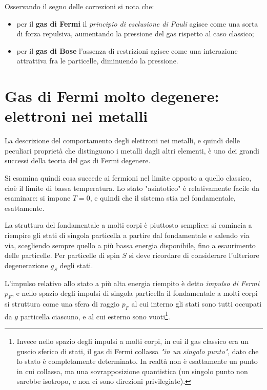 Osservando il segno delle correzioni si nota che:
\begin{itemize}
	\item per il \textbf{gas di Fermi} il \textit{principio di esclusione di Pauli} agisce come una sorta di forza repulsiva, aumentando la pressione del gas rispetto al caso classico;
	\item per il \textbf{gas di Bose} l'assenza di restrizioni agisce come una interazione attrattiva fra le particelle, diminuendo la pressione.
\end{itemize}

\section{Gas di Fermi molto degenere: elettroni nei metalli}
\label{sec:fermigas}
La descrizione del comportamento degli elettroni nei metalli, e quindi delle peculiari proprietà che distinguono i metalli dagli altri elementi, è uno dei grandi successi della teoria del gas di Fermi degenere.
\newline

Si esamina quindi cosa succede ai fermioni nel limite opposto a quello classico, cioè il limite di bassa temperatura.
Lo stato "asintotico" è relativamente facile da esaminare: si impone $T=0$, e quindi che il sistema stia nel fondamentale, esattamente.

La struttura del fondamentale a molti corpi è piuttosto semplice: si comincia a riempire gli stati di singola particella a partire dal fondamentale e salendo via via, scegliendo sempre quello a più bassa energia disponibile, fino a esaurimento delle particelle. Per particelle di spin $S$ si deve ricordare di considerare l'ulteriore degenerazione $g_S$ degli stati.

L'impulso relativo allo stato a più alta energia riempito è detto \textit{impulso di Fermi} $p_F$, e nello spazio degli impulsi di singola particella il fondamentale a molti corpi si struttura come una sfera di raggio $p_F$ al cui interno gli stati sono tutti occupati da $g$ particella ciascuno, e al cui esterno sono vuoti\footnote{Invece nello spazio degli impulsi a molti corpi, in cui il gas classico era un guscio sferico di stati, il gas di Fermi collassa \textit{"in un singolo punto"}, dato che lo stato è completamente determinato. In realtà non è esattamente un punto in cui collassa, ma una sovrapposizione quantistica (un singolo punto non sarebbe isotropo, e non ci sono direzioni privilegiate).}.

